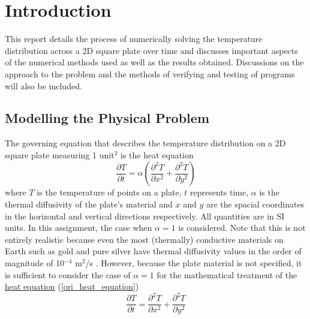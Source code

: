 \documentclass[a4paper]{article}
\begin{document}


\pagestyle{plain}
\tableofcontents

\newpage
\section{Introduction}
	This report details the process of numerically solving the temperature distribution across a 2D square plate over time and discusses important aspects of the numerical methods used as well as the results obtained. Discussions on the approach to the problem and the methods of verifying and testing of programs will also be included.
	
	\subsection{Modelling the Physical Problem}
		The governing equation that describes the temperature distribution on a 2D square plate measuring 1 unit$^2$ is the heat equation \citep{Brown1958}
		\begin{equation}
			\frac{\partial T}{\partial t}
			=
			\alpha\left(\frac{\partial^2 T}{\partial x^2} + \frac{\partial^2 T}{\partial y^2}\right)
			\label{ori_heat_equation}
		\end{equation}
		where $T$ is the temperature of points on a plate, $t$ represents time, $\alpha$ is the thermal diffusivity of the plate's material and $x$ and $y$ are the spacial coordinates in the horizontal and vertical directions respectively. All quantities are in SI units. In this assignment, the case when $\alpha=1$ is considered. Note that this is not entirely realistic because even the most (thermally) conductive materials on Earth such as gold and pure silver have thermal diffusivity values in the order of magnitude of 10$^{-4}$ m$^2/$s \citep{Brown1958}. However, because the plate material is not specified, it is sufficient to consider the case of $\alpha = 1$ for the mathematical treatment of the \hyperref[ori_heat_equation]{heat equation} (\autoref{ori_heat_equation})
		\begin{equation}
			\frac{\partial T}{\partial t}
			=
			\frac{\partial^2 T}{\partial x^2} + \frac{\partial^2 T}{\partial y^2}
			\label{heat_equation}
		\end{equation}
\end{document}
